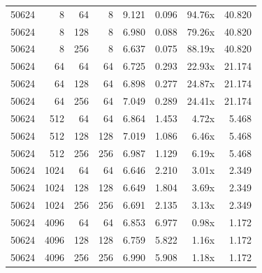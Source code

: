 {\begin{longtable}{rrrrrrrr}
50624 & 8 & 64 & 8 & 9.121 & 0.096 & 94.76x & 40.820\\
50624 & 8 & 128 & 8 & 6.980 & 0.088 & 79.26x & 40.820\\
50624 & 8 & 256 & 8 & 6.637 & 0.075 & 88.19x & 40.820\\
50624 & 64 & 64 & 64 & 6.725 & 0.293 & 22.93x & 21.174\\
50624 & 64 & 128 & 64 & 6.898 & 0.277 & 24.87x & 21.174\\
50624 & 64 & 256 & 64 & 7.049 & 0.289 & 24.41x & 21.174\\
50624 & 512 & 64 & 64 & 6.864 & 1.453 & 4.72x & 5.468\\
50624 & 512 & 128 & 128 & 7.019 & 1.086 & 6.46x & 5.468\\
50624 & 512 & 256 & 256 & 6.987 & 1.129 & 6.19x & 5.468\\
50624 & 1024 & 64 & 64 & 6.646 & 2.210 & 3.01x & 2.349\\
50624 & 1024 & 128 & 128 & 6.649 & 1.804 & 3.69x & 2.349\\
50624 & 1024 & 256 & 256 & 6.691 & 2.135 & 3.13x & 2.349\\
50624 & 4096 & 64 & 64 & 6.853 & 6.977 & 0.98x & 1.172\\
50624 & 4096 & 128 & 128 & 6.759 & 5.822 & 1.16x & 1.172\\
50624 & 4096 & 256 & 256 & 6.990 & 5.908 & 1.18x & 1.172\\
\end{longtable}
}

